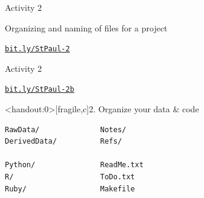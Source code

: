 \documentclass[12pt,t]{beamer}
\begin{document}
\begin{frame}[c]{Activity 2}

\begin{center}
\large
Organizing and naming of files for a project

\vspace{10mm}

\href{http://bit.ly/StPaul-2}{\tt bit.ly/StPaul-2}

\end{center}


\end{frame}



\begin{frame}[c]{Activity 2}

\vspace{5mm}



\vspace{5mm}

\hfill \href{http://bit.ly/StPaul-2b}{\tt bit.ly/StPaul-2b}

\end{frame}




\begin{frame}<handout:0>[fragile,c]{2. Organize your data \& code}


\begin{center}
\begin{minipage}[c]{10.3cm}
\begin{semiverbatim}
\lstset{basicstyle=\normalsize}
\begin{lstlisting}[linewidth=10.3cm]
RawData/              Notes/
DerivedData/          Refs/

Python/               ReadMe.txt
R/                    ToDo.txt
Ruby/                 Makefile
\end{lstlisting}
\end{semiverbatim}
\end{minipage}
\end{center}

\end{frame}
\end{document}
